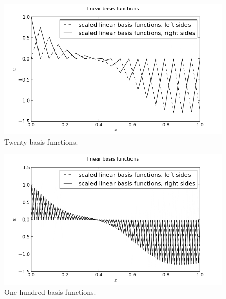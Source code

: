 \documentclass[10pt]{article}
\begin{document}
\begin{figure}[ht]
 \centering
 \includegraphics[width=\columnwidth,keepaspectratio=true]{./hw7-basis_functions-N20.png}
 \caption{Twenty basis functions.}
 \label{fig:N20}
\end{figure}

\begin{figure}[ht]
 \centering
 \includegraphics[width=\columnwidth,keepaspectratio=true]{./hw7-basis_functions-N100.png}
 \caption{One hundred basis functions.}
 \label{fig:N100}
\end{figure}
\end{document}
